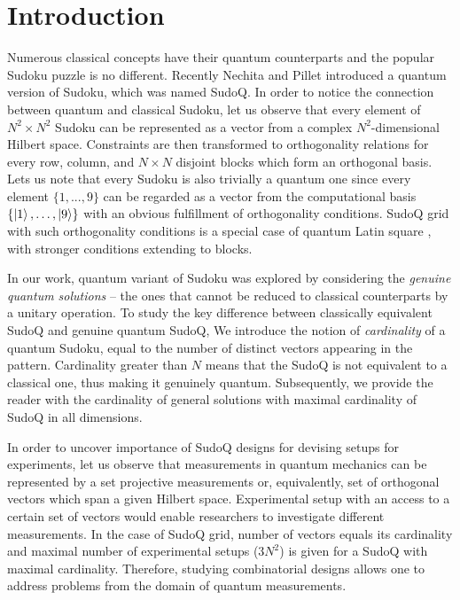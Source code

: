 \documentclass[aps,onecolumn,floatfix,superscriptaddress]{revtex4}
\begin{document}
\maketitle

\section{Introduction}
Numerous classical concepts have their quantum counterparts and the popular Sudoku puzzle is no different. Recently Nechita and Pillet \cite{Nechita2020SudoQA} introduced a quantum version of Sudoku, which was named SudoQ. In order to notice the connection between quantum and classical Sudoku, let us observe that every element of $N^{2}\times N^{2}$ Sudoku can be represented as a vector from a complex $N^{2}$-dimensional Hilbert space. Constraints are then transformed to orthogonality relations for every row, column, and $N \times N$ disjoint blocks which form an orthogonal basis. Lets us note that every Sudoku is also trivially a quantum one since every element $\{1, ..., 9\}$ can be regarded as a vector from the computational basis $\{ \ket{1}, \ldots , \ket{9}\}$ with an obvious fulfillment of orthogonality conditions.
SudoQ grid with such orthogonality conditions is a special case of quantum Latin square \cite{musto2016quantum}, with stronger conditions extending to blocks.

In our work, quantum variant of Sudoku was explored by considering the \emph{genuine quantum solutions} – the ones that cannot be reduced to classical counterparts by a unitary operation. 
To study the key difference between classically equivalent SudoQ and genuine quantum SudoQ, We introduce the notion of \emph{cardinality} of a quantum Sudoku, equal to the number of distinct vectors appearing in the pattern. Cardinality greater than $N$ means that the SudoQ is not equivalent to a classical one, thus making it genuinely quantum. Subsequently, we provide the reader with the cardinality of general solutions with maximal cardinality of SudoQ in all dimensions. 

In order to uncover importance of SudoQ designs for devising setups for experiments, let us observe that measurements in quantum mechanics can be represented by a set projective measurements or, equivalently, set of orthogonal vectors which span a given Hilbert space.
Experimental setup with an access to a certain set of vectors would enable researchers to investigate different measurements.
In the case of SudoQ grid, number of vectors equals its cardinality and maximal number of experimental setups ($3N^2$) is given for a SudoQ with maximal cardinality.
Therefore, studying combinatorial designs allows one to address problems from the domain of quantum measurements. 
\end{document}
